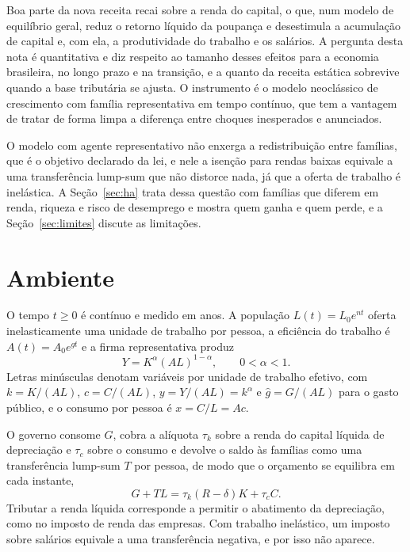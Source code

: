 \documentclass[11pt,a4paper]{article}
\begin{document}
Boa parte da nova receita recai sobre a renda do capital, o que, num modelo
de equilíbrio geral, reduz o retorno líquido da poupança e desestimula a
acumulação de capital e, com ela, a produtividade do trabalho e os salários.
A pergunta desta nota é quantitativa e diz respeito ao tamanho desses efeitos
para a economia brasileira, no longo prazo e na transição, e a quanto da
receita estática sobrevive quando a base tributária se ajusta. O instrumento
é o modelo neoclássico de crescimento com família representativa em tempo
contínuo, que tem a vantagem de tratar de forma limpa a diferença entre
choques inesperados e anunciados.

O modelo com agente representativo não enxerga a redistribuição entre
famílias, que é o objetivo declarado da lei, e nele a isenção para rendas
baixas equivale a uma transferência lump-sum que não distorce nada, já que a
oferta de trabalho é inelástica. A Seção~\ref{sec:ha} trata dessa questão com
famílias que diferem em renda, riqueza e risco de desemprego e mostra quem
ganha e quem perde, e a Seção~\ref{sec:limites} discute as limitações.

\section{Ambiente}

O tempo $t\ge0$ é contínuo e medido em anos. A população $L(t)=L_0e^{nt}$
oferta inelasticamente uma unidade de trabalho por pessoa, a eficiência do
trabalho é $A(t)=A_0e^{gt}$ e a firma representativa produz
\begin{equation}
 Y=K^\alpha(AL)^{1-\alpha},\qquad 0<\alpha<1.
 \label{eq:producao}
\end{equation}
Letras minúsculas denotam variáveis por unidade de trabalho efetivo, com
$k=K/(AL)$, $c=C/(AL)$, $y=Y/(AL)=k^\alpha$ e $\hat g=G/(AL)$ para o gasto
público, e o consumo por pessoa é $x=C/L=Ac$.

O governo consome $G$, cobra a alíquota $\tau_k$ sobre a renda do capital
líquida de depreciação e $\tau_c$ sobre o consumo e devolve o saldo às
famílias como uma transferência lump-sum $T$ por pessoa, de modo que o
orçamento se equilibra em cada instante,
\begin{equation}
 G+TL=\tau_k(R-\delta)K+\tau_cC.
 \label{eq:governo}
\end{equation}
Tributar a renda líquida corresponde a permitir o abatimento da depreciação,
como no imposto de renda das empresas. Com trabalho inelástico, um imposto
sobre salários equivale a uma transferência negativa, e por isso não aparece.
\end{document}
